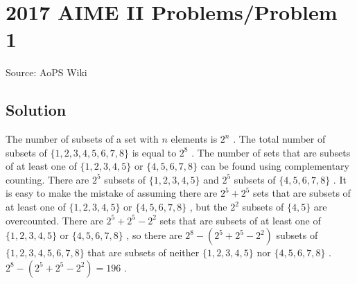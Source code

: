 \documentclass[12pt]{article}
\begin{document}
\section*{{2017 AIME II Problems/Problem 1}}
Source: AoPS Wiki

\subsection*{Solution}
The number of subsets of a set with $n$ elements is $2^n$ . The total number of subsets of $\{1, 2, 3, 4, 5, 6, 7, 8\}$ is equal to $2^8$ . The number of sets that are subsets of at least one of $\{1, 2, 3, 4, 5\}$ or $\{4, 5, 6, 7, 8\}$ can be found using complementary counting. There are $2^5$ subsets of $\{1, 2, 3, 4, 5\}$ and $2^5$ subsets of $\{4, 5, 6, 7, 8\}$ . It is easy to make the mistake of assuming there are $2^5+2^5$ sets that are subsets of at least one of $\{1, 2, 3, 4, 5\}$ or $\{4, 5, 6, 7, 8\}$ , but the $2^2$ subsets of $\{4, 5\}$ are overcounted. There are $2^5+2^5-2^2$ sets that are subsets of at least one of $\{1, 2, 3, 4, 5\}$ or $\{4, 5, 6, 7, 8\}$ , so there are $2^8-(2^5+2^5-2^2)$ subsets of $\{1, 2, 3, 4, 5, 6, 7, 8\}$ that are subsets of neither $\{1, 2, 3, 4, 5\}$ nor $\{4, 5, 6, 7, 8\}$ . $2^8-(2^5+2^5-2^2)=\boxed{196}$ .
\end{document}

